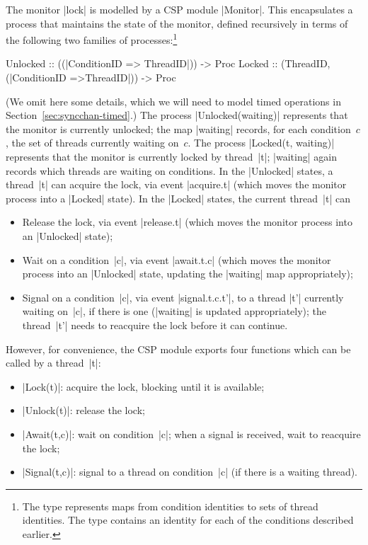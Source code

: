 
The monitor |lock| is modelled by a CSP module |Monitor|.  This encapsulates a
process that maintains the state of the monitor, defined recursively in terms
of the following two families of processes:\footnote{%
%
The type  represents maps from condition
identities to sets of thread identities.  The type  contains
an identity for each of the conditions described earlier.}
%
\begin{cspm}
Unlocked :: ((|ConditionID => {ThreadID}|)) -> Proc 
Locked :: (ThreadID, (|ConditionID =>{ThreadID}|)) -> Proc 
\end{cspm}
%
(We omit here some details, which we will need to model timed operations in
Section~\ref{sec:syncchan-timed}.)  The process |Unlocked(waiting)| represents
that the monitor is currently unlocked; the map |waiting| records, for each
condition~$c$, the set of threads currently waiting on~$c$.  The process
|Locked(t, waiting)| represents that the monitor is currently locked by
thread~|t|; |waiting| again records which threads are waiting on conditions.
In the |Unlocked| states, a thread~|t| can acquire the lock, via event
|acquire.t| (which moves the monitor process into a |Locked| state).  In the
|Locked| states, the current thread~|t| can
\begin{itemize}
\item Release the lock, via event |release.t| (which moves the monitor process
  into an |Unlocked| state);
\item Wait on a condition~|c|, via event |await.t.c| (which moves the monitor
  process into an |Unlocked| state, updating the |waiting| map appropriately);
\item Signal on a condition~|c|, via event |signal.t.c.t'|, to a thread |t'|
  currently waiting on~|c|, if there is one (|waiting| is updated
  appropriately); the thread~|t'| needs to reacquire the lock before it can
  continue.
\end{itemize}
%
However, for convenience, the CSP module exports four functions which can be
called by a thread~|t|:
%
\begin{itemize}
\item |Lock(t)|: acquire the lock, blocking until it is available;
\item |Unlock(t)|: release the lock;
\item |Await(t,c)|: wait on condition~|c|; when a signal is received, wait to
  reacquire the lock;
\item |Signal(t,c)|: signal to a thread on condition~|c| (if there is a
  waiting thread). 
\end{itemize}

